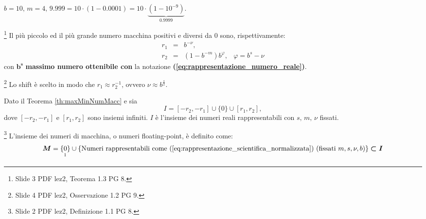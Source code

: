 

\begin{example}
	$b=10,\, m=4,\, 9.999=10\cdot(1-0.0001)=10\cdot\underbrace{(1-10^{-9})}_{0.9999}.$
\end{example}

\begin{theorem}\label{th:maxMinNumMacc}\footnote{Slide 3 PDF lez2, Teorema 1.3 PG 8.}
	Il più piccolo ed il più grande numero macchina positivi e diversi da 0 sono, rispettivamente:
	\begin{equation}\label{eq:minMaxNrPrecMacc}
		\begin{matrix}
			r_1 &=& b^{-\nu},&\\
			r_2 &=& (1-b^{-m})b^\varphi,& \varphi=b^s-\nu
		\end{matrix}
	\end{equation}
	con $\boldsymbol{b^s}$ \textbf{massimo numero ottenibile con} la notazione \textbf{(\ref{eq:rappresentazione_numero_reale})}.
\end{theorem}

\begin{remark}\footnote{Slide 4 PDF lez2, Osservazione 1.2 PG 9.}
	Lo shift è scelto in modo che $r_1\approx r_2^{-1}$, ovvero $\nu\approx b^{\frac{s}{2}}$.
\end{remark}

\begin{definition}
	Dato il Teorema \ref{th:maxMinNumMacc} e sia 
	\begin{equation}\label{eq:insDomFFloaPoint}
		I=[-r_2,-r_1]\cup \{0\}\cup [r_1,r_2],
	\end{equation}
	dove $[-r_2,-r_1]$ e $[r_1,r_2]$ sono insiemi infiniti. $I$ è l'insieme dei numeri reali rappresentabili con $s,\,m,\,\nu$ fissati.
\end{definition}

\begin{definition}\footnote{Slide 2 PDF lez2, Definizione 1.1 PG 8.}
	L'insieme dei numeri di macchina, o numeri floating-point, è definito come:
	\begin{equation}
		\boldsymbol{M} = \underset{\footnotemark}{\{0\}}\cup \{\text{Numeri rappresentabili come (\ref{eq:rappresentazione_scientifica_normalizzata}) (fissati }m,s,\nu, b) \} \boldsymbol{\subset I}
	\end{equation}
\end{definition}

